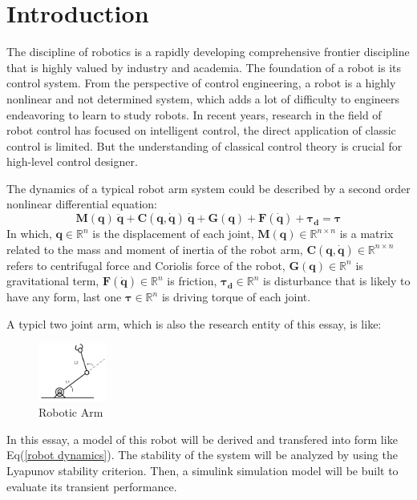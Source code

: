 \documentclass[a4paper]{article}
\begin{document}
\section{Introduction}

The discipline of robotics is a rapidly developing comprehensive frontier discipline that is highly valued by industry and academia. The foundation of a robot is its control system. From the perspective of control engineering, a robot is a highly nonlinear and not determined system, which adds a lot of difficulty to engineers endeavoring to learn to study robots. In recent years, research in the field of robot control has focused on intelligent control, the direct application of classic control is limited. But the understanding of classical control theory is crucial for high-level control designer. \par

The dynamics of a typical robot arm system could be described by a second order nonlinear differential equation:  
\begin{equation}
\boldsymbol{M(q)\ \ddot{q}}+\boldsymbol{C(q,\dot{q})\ \dot{q}}+\boldsymbol{G(q)} + \boldsymbol{F(\dot{q} )} + \boldsymbol{\tau_d} = \boldsymbol{\tau}
\label{robot dynamics}
\end{equation}
In which, $\boldsymbol{q}\in \mathbb{R}^{n}$ is the displacement of each joint, $\boldsymbol{M(q)}\in \mathbb{R}^{n\times n}$ is a matrix related to the mass and moment of inertia of the robot arm, $\boldsymbol{C(q,\dot{q})}\in \mathbb{R}^{n\times n}$ refers to centrifugal force and Coriolis force of the robot, $\boldsymbol{G(q)}\in \mathbb{R}^{n}$ is gravitational term, $\boldsymbol{F(\dot{q})}\in \mathbb{R}^n$ is friction, $\boldsymbol{\tau_d} \in \mathbb{R}^n$ is disturbance that is likely to have any form, last one $\boldsymbol{\tau} \in \mathbb{R}^n$ is driving torque of each joint\cite{ref1}.

A typicl two joint arm, which is also the research entity of this essay, is like: 
\begin{figure}[H]
\centering
\includegraphics[width = 0.2\textwidth]{pic/robo.png}
\caption{Robotic Arm}
\end{figure}

In this essay, a model of this robot will be derived and transfered into form like Eq(\ref{robot dynamics}). The stability of the system will be analyzed by using the Lyapunov stability criterion. Then, a simulink simulation model will be built to evaluate its transient performance.
\end{document}
